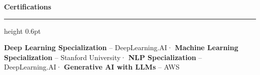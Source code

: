 \documentclass[10.5pt,letterpaper]{article}
\newcommand{\cvsection}[1]{%
  \vspace{0.2em}%
  {\color{headerblue}\large\bfseries #1}%
  \vspace{0.08em}%
  {\color{goldaccent}\hrule height 0.6pt}%
  \vspace{0.2em}%
}
\begin{document}
\cvsection{Certifications}

{\color{darktext}
\textbf{Deep Learning Specialization} {\color{lightgray}-- DeepLearning.AI}\enspace·\enspace
\textbf{Machine Learning Specialization} {\color{lightgray}-- Stanford University}\enspace·\enspace
\textbf{NLP Specialization} {\color{lightgray}-- DeepLearning.AI}\enspace·\enspace
\textbf{Generative AI with LLMs} {\color{lightgray}-- AWS}
}
\end{document}
